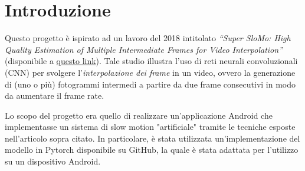 \chapter*{Introduzione}

Questo progetto è ispirato ad un lavoro del 2018 intitolato 
\textit{``Super SloMo: High Quality Estimation of Multiple Intermediate Frames for Video Interpolation''}
(disponibile a \href{http://jianghz.me/projects/superslomo/}{questo link}).
Tale studio illustra l'uso di reti neurali convoluzionali (CNN) per svolgere l'\textit{interpolazione dei frame} in un video, ovvero la generazione
di (uno o più) fotogrammi intermedi a partire da due frame consecutivi in modo da aumentare il frame rate.

Lo scopo del progetto era quello di realizzare un'applicazione Android
che implementasse un sistema di slow motion "artificiale" tramite le tecniche esposte nell'articolo sopra citato.
In particolare, è stata utilizzata un'implementazione del modello in Pytorch disponibile su GitHub, la quale è stata adattata per l'utilizzo su un dispositivo Android.